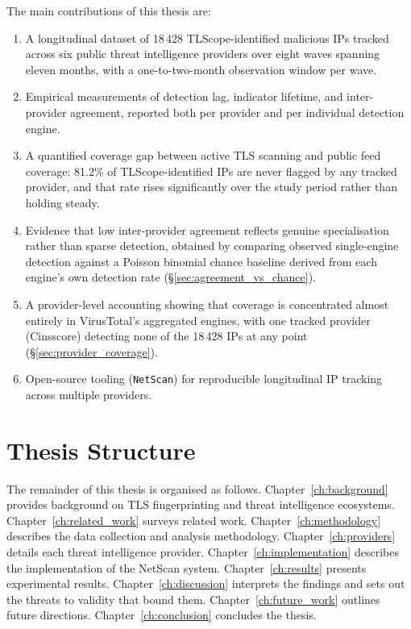 \documentclass[12pt, a4paper, twoside]{report}
\begin{document}
The main contributions of this thesis are:
\begin{enumerate}
  \item A longitudinal dataset of 18\,428 TLScope-identified malicious IPs tracked across six
    public threat intelligence providers over eight waves spanning eleven months, with a
    one-to-two-month observation window per wave.
  \item Empirical measurements of detection lag, indicator lifetime, and inter-provider agreement,
    reported both per provider and per individual detection engine.
  \item A quantified coverage gap between active TLS scanning and public feed coverage: 81.2\% of
    TLScope-identified IPs are never flagged by any tracked provider, and that rate rises
    significantly over the study period rather than holding steady.
  \item Evidence that low inter-provider agreement reflects genuine specialisation rather than
    sparse detection, obtained by comparing observed single-engine detection against a Poisson
    binomial chance baseline derived from each engine's own detection rate
    (\S\ref{sec:agreement_vs_chance}).
  \item A provider-level accounting showing that coverage is concentrated almost entirely in
    VirusTotal's aggregated engines, with one tracked provider (Cinsscore) detecting none of the
    18\,428 IPs at any point (\S\ref{sec:provider_coverage}).
  \item Open-source tooling (\texttt{NetScan}) for reproducible longitudinal IP tracking across
    multiple providers.
\end{enumerate}

\section{Thesis Structure}

The remainder of this thesis is organised as follows. Chapter~\ref{ch:background} provides
background on TLS fingerprinting and threat intelligence ecosystems.
Chapter~\ref{ch:related_work} surveys related work.
Chapter~\ref{ch:methodology} describes the data collection and analysis methodology.
Chapter~\ref{ch:providers} details each threat intelligence provider.
Chapter~\ref{ch:implementation} describes the implementation of the NetScan system.
Chapter~\ref{ch:results} presents experimental results.
Chapter~\ref{ch:discussion} interprets the findings and sets out the threats to validity that bound
them. Chapter~\ref{ch:future_work} outlines future directions.
Chapter~\ref{ch:conclusion} concludes the thesis.
\end{document}
